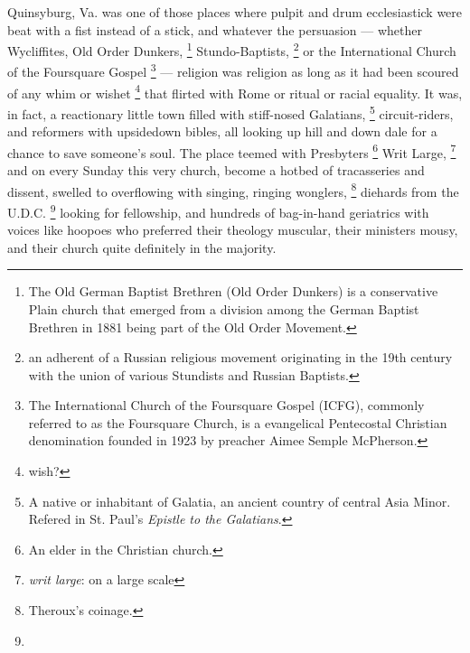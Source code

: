   Quinsyburg, Va. was one of those places where pulpit 
and drum ecclesiastick were beat with a fist instead of a stick, and whatever 
the persuasion --- whether Wycliffites, Old Order Dunkers, 
\footnote{The Old German Baptist Brethren (Old Order Dunkers) is a conservative Plain church
that emerged from a division among the German Baptist Brethren in 1881 being
part of the Old Order Movement.}
Stundo-Baptists, 
\footnote{an adherent of a Russian religious movement originating in the 19th
  century with the union of various Stundists and Russian Baptists.}
or the International Church of the Foursquare Gospel 
\footnote{The International Church of the Foursquare Gospel (ICFG), commonly
  referred to as the Foursquare Church, is a evangelical Pentecostal Christian
  denomination founded in 1923 by preacher Aimee Semple McPherson.}
--- religion was religion as long as it had been scoured 
of any whim 
or wishet 
\footnote{ \textdbend wish?}
that flirted with Rome or ritual or racial equality. It was,
in fact, a reactionary little town filled with stiff-nosed Galatians,
\footnote{ A native or inhabitant of Galatia, an ancient country of central Asia
  Minor. Refered in St. Paul's \textit{Epistle to the Galatians}. }
circuit-riders, and reformers with upsidedown bibles, all looking up hill and
down dale 
for a chance to save someone's soul. The place teemed 
with Presbyters 
\footnote{An elder in the Christian church.}
Writ Large, 
\footnote{\textit{writ large}: on a large scale}
and on every Sunday this very church, become a hotbed of tracasseries 
and dissent, swelled to overflowing with singing, ringing wonglers,
\footnote{\textdbend Theroux's coinage. }
diehards from the U.D.C. 
\footnote{ \textdbend}
looking for fellowship, and hundreds of bag-in-hand geriatrics 
with voices like hoopoes 
who preferred their theology muscular, their ministers mousy, 
and their church quite definitely in the majority.

